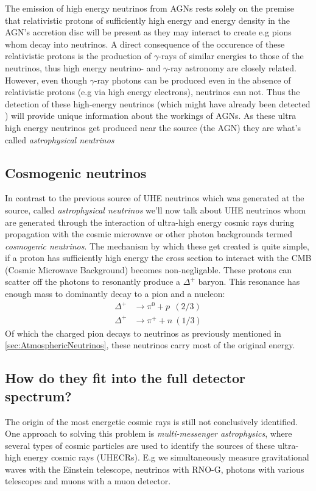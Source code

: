 \documentclass[11pt,a4paper,faculty=we,language=en,doctype=report]{cls/ugent-doc}
\begin{document}
The emission of high energy neutrinos from AGNs rests solely on the premise
that relativistic protons of sufficiently high energy and energy density in the
AGN's accretion disc will be present \cite{NASANeutrinos} as they may interact
to create e.g pions whom decay into neutrinos. A direct consequence of the occurence of these
relativistic protons is the production of $\gamma$-rays of similar energies to
those of the neutrinos, thus high energy neutrino- and $\gamma$-ray astronomy are
closely related.  However, even though $\gamma$-ray photons can be produced
even in the absence of relativistic protons (e.g via high energy electrons),
neutrinos can not.  Thus the detection of these high-energy neutrinos (which
might have already been detected \cite{AGNNeutrino}) will provide unique
information about the workings of AGNs.
As these ultra high energy neutrinos get produced near the source (the AGN)
they are what's called \textit{astrophysical neutrinos}

\subsection{Cosmogenic neutrinos}
In contrast to the previous source of UHE neutrinos which was generated at the
source, called \textit{astrophysical neutrinos} we'll now talk about UHE
neutrinos whom are generated through the interaction of ultra-high energy
cosmic rays during propagation with the cosmic microwave or other photon
backgrounds termed \textit{cosmogenic neutrinos}.  The mechanism by which these
get created is quite simple, if a proton has sufficiently high energy the cross
section to interact with the CMB (Cosmic Microwave Background) becomes
non-negligable.  These protons can scatter off the photons to resonantly
produce a $\Delta^+$ baryon.  This resonance has enough mass to dominantly
decay to a pion and a nucleon:
\begin{align}
	\Delta^+ &\rightarrow \pi^0 + p \ \ (2/3)\\
	\Delta^+ &\rightarrow \pi^+ + n \ (1/3)
\end{align}
Of which the charged pion decays to neutrinos as previously mentioned in 
\ref{sec:AtmosphericNeutrinos}, these neutrinos carry most of the original energy.
\subsection{How do they fit into the full detector spectrum?}
The origin of the most energetic cosmic rays is still not conclusively
identified. One approach to solving this problem is \textit{multi-messenger
astrophysics}, where several types of cosmic particles are used to identify the
sources of these ultra-high energy cosmic rays (UHECRs). E.g we simultaneously
measure gravitational waves with the Einstein telescope, neutrinos with RNO-G,
photons with various telescopes and muons with a muon detector.
\newpage
\end{document}
